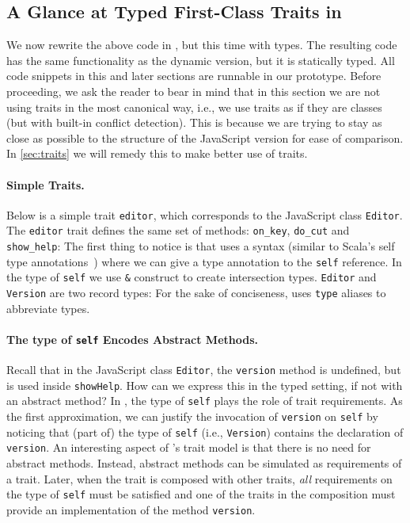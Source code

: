 \subsection{A Glance at Typed First-Class Traits in \sedel}

We now rewrite the above code in \sedel, but this time with types. The resulting code has the same functionality as the dynamic version, but it is
statically typed. All code snippets in this and later sections are runnable in
our prototype. Before proceeding, we ask the reader to bear in mind that in this section we are not using traits
in the most canonical way, i.e., we use traits as if they are classes (but with
built-in conflict detection). This is because we are trying to stay as close as possible
to the structure of the JavaScript version for ease of comparison. In
\cref{sec:traits} we will remedy this to make better use of traits.

\paragraph{Simple Traits.}
Below is a simple trait \lstinline{editor}, which corresponds to the JavaScript
class \lstinline{Editor}. The \lstinline{editor} trait defines the same set of
methods: \lstinline{on_key}, \lstinline{do_cut} and \lstinline{show_help}:
The first thing to notice is that \sedel uses a syntax (similar to Scala's
self type annotations~\citep{odersky2004overview}) where we can give a type annotation to the
\lstinline{self} reference. In the type of \lstinline{self} we use
\lstinline{&} construct to create intersection types. \lstinline{Editor} and \lstinline{Version} are two record types:
For the sake of conciseness, \sedel uses \lstinline{type} aliases to abbreviate types.

\paragraph{The type of \lstinline{self} Encodes Abstract Methods.}
Recall that in the JavaScript class \lstinline{Editor}, the \lstinline{version}
method is undefined, but is used inside \lstinline{showHelp}. How can we express
this in the typed setting, if not with an abstract method? In \sedel, the type of \lstinline{self}
plays the role of trait requirements. As the first approximation, we
can justify the invocation of \lstinline{version} on \lstinline{self} by noticing that (part of) the
type of \lstinline{self} (i.e., \lstinline{Version}) contains the declaration of
\lstinline{version}. An interesting aspect of \sedel's trait model is that there
is no need for abstract methods. Instead, abstract methods can be simulated as
requirements of a trait. Later, when the trait is composed with other
traits, \emph{all} requirements on the type of \lstinline{self} must be
satisfied and one of the traits in the composition must provide an
implementation of the method \lstinline{version}.

